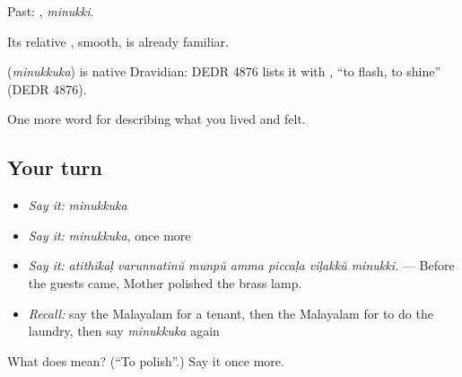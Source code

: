 Past: , \emph{minukki}.

Its relative , smooth, is already familiar.

\begin{cousinweb}
\textbf{} (\emph{minukkuka}) is native Dravidian: DEDR 4876 lists it with , \textquotedblleft{}to flash, to shine\textquotedblright{} (DEDR 4876).
\end{cousinweb}

\begin{grammarlens}[title={What you've built}]
One more word for describing what you lived and felt.
\end{grammarlens}

\subsection*{Your turn}
\begin{itemize}
\raggedright
  \item \emph{Say it:} \emph{minukkuka}
  \item \emph{Say it:} \emph{minukkuka}, once more
  \item \emph{Say it:} \emph{atithikaḷ varunnatinŭ munpŭ amma piccaḷa viḷakkŭ minukki.} — Before the guests came, Mother polished the brass lamp.
  \item \emph{Recall:} say the Malayalam for a tenant, then the Malayalam for to do the laundry, then say \emph{minukkuka} again
\end{itemize}

\begin{tcolorbox}[breakable,colback=teal!4,colframe=teal!35!black,title={Before you move on}]
What does  mean? (\textquotedblleft{}To polish\textquotedblright{}.) Say it once more.
\end{tcolorbox}
